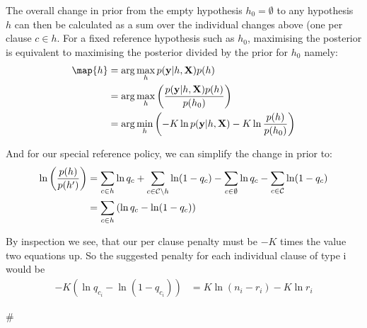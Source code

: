 The overall change in prior from the empty hypothesis $h_0 = \emptyset$ to any hypothesis $h$ can then be calculated as a sum over the individual changes above (one per clause $c \in h$. For a fixed reference hypothesis such as $h_0$, maximising the posterior is equivalent to maximising the posterior divided by the prior for $h_0$ namely:
\begin{align}
\map{h}
& = \arg\max_{h} p(\vec{y}|h, \vec{X}) p(h)  \\
& = \arg\max_{h} \left(\frac{ p(\vec{y}|h, \vec{X}) p(h)}{p(h_0)}\right)  \\
& = \arg\min_{h} \left( -K\ln p(\vec{y}|h, \vec{X}) - K \ln \frac{p(h)}{p(h_0)}\right)  \\
\end{align}

And for our special reference policy, we can simplify the change in prior to:
\begin{align}
\ln \left(\frac{p(h)}{p(h')}\right) 
& = \sum_{c \in h} \ln q_c + \sum_{c \in \mathcal{C}\setminus h} \ln(1-q_c)
- \sum_{c \in \emptyset} \ln q_c - \sum_{c \in \mathcal{C}} \ln(1-q_c) \\
& = \sum_{c \in h} \left(\ln q_c - \ln(1-q_c) \right)
\end{align}


By inspection we see, that our per clause penalty must be $-K$ times the value two equations up. So the suggested penalty for each individual clause of type i would be
\begin{align}
-K\left(\ln q_{c_i} 
-\ln(1-q_{c_i}) \right)
& =  K \ln(n_i - r_i) - K \ln r_i
\end{align}

#%



